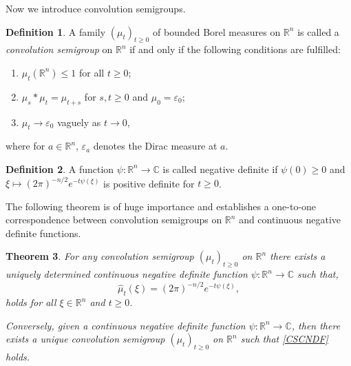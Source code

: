 \documentclass[a4paper, 12pt]{report}
\newtheorem{theorem}{Theorem}[section]
\theoremstyle{cor}
\theoremstyle{remark}
\theoremstyle{definition}
\newtheorem{defn}[theorem]{Definition}
\begin{document}
Now we introduce convolution semigroups.

\begin{defn}
A family $(\mu_t)_{t \ge 0}$ of bounded Borel measures on $\mathbb{R}^n$ is called a \emph{convolution semigroup} on $\mathbb{R}^n$ if and only if the following conditions are fulfilled:
\begin{enumerate}
\item $\mu_t(\mathbb{R}^n) \le 1$ for all $t \ge 0$;

\item $\mu_s \ast \mu_t = \mu_{t + s}$ for $s, t \ge 0$ and $\mu_0 = \varepsilon_0$;

\item $\mu_t \to \varepsilon_0$ vaguely as $t \to 0$,
\end{enumerate}
where for $a \in \mathbb{R}^n$, $\varepsilon_a$ denotes the Dirac measure at $a$.
\end{defn}

\begin{defn}
A function $\psi : \mathbb{R}^n \to \mathbb{C}$ is called negative definite if $\psi(0) \ge 0$ and $\xi \mapsto (2\pi)^{-n/2}e^{-t\psi(\xi)}$ is positive definite for $t \ge 0$.
\end{defn}

The following theorem is of huge importance and establishes a one-to-one correspondence between convolution semigroups on $\mathbb{R}^n$ and continuous negative definite functions.
\begin{theorem}
For any convolution semigroup $(\mu_t)_{t \ge 0}$ on $\mathbb{R}^n$ there exists a uniquely determined continuous negative definite function $\psi : \mathbb{R}^n \to \mathbb{C}$ such that,
\begin{equation}
\hat{\mu}_t(\xi) = (2\pi)^{-n/2}e^{-t\psi(\xi)},\label{CSCNDF}
\end{equation}
holds for all $\xi \in \mathbb{R}^n$ and $t \ge 0$.

Conversely, given a continuous negative definite function $\psi : \mathbb{R}^n \to \mathbb{C}$, then there exists a unique convolution semigroup $(\mu_t)_{t \ge 0}$ on $\mathbb{R}^n$ such that \eqref{CSCNDF} holds.
\end{theorem}
\end{document}
